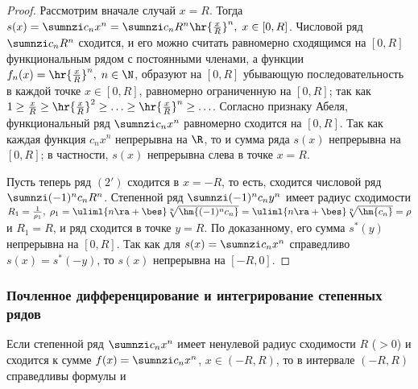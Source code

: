 \documentclass[a4paper]{article}
\begin{document}
\begin{proof}
Рассмотрим вначале случай $x=R$. Тогда $s(x) = \sumnzi c_nx^n =
\sumnzi c_nR^n \hr{\frac{x}R}^n, \; x\in[0,R]$. Числовой ряд
$\sumnzi c_nR^n$ сходится, и его можно считать равномерно сходящимся
на $[0,R]$ функциональным рядом с постоянными членами, а функции
$f_n(x) = \hr{\frac{x}R}^n, \; n\in\N$, образуют на $[0,R]$
убывающую последовательность в каждой точке $x\in[0,R]$, равномерно
ограниченную на $[0,R]$; так как $1\ge \frac{x}R \ge
\hr{\frac{x}R}^2 \ge \ldots \ge \hr{\frac{x}R}^n \ge \ldots$.
Согласно признаку Абеля, функциональный ряд $\sumnzi c_nx^n$
равномерно сходится на $[0,R]$. Так как каждая функция $c_nx^n$
непрерывна на $\R$, то и сумма ряда $s(x)$ непрерывна на $[0,R]$; в
частности, $s(x)$ непрерывна слева в точке $x=R$.

Пусть теперь ряд $(2')$ сходится в $x=-R$, то есть, сходится
числовой ряд $\sumnzi (-1)^nc_nR^n$. Степенной ряд $\sumnzi (-1)^n
c_n y^n$
имеет радиус сходимости $R_1 = \frac1{\rho_1}, \; \rho_1 =
\uliml{n\ra+\bes} \sqrt[n]{\hm{(-1)^n c_n}} = \uliml{n\ra+\bes}
\sqrt[n]{\hm{c_n}} = \rho$ и $R_1=R$, и ряд сходится в точке $y=R$.
По доказанному, его сумма $s^*(y)$ непрерывна на $[0,R]$. Так как
для $s(x) = \sumnzi c_nx^n$ справедливо $s(x) = s^*(-y)$,
то $s(x)$ непрерывна на $[-R,0]$.
\end{proof}

\subsubsection{Почленное дифференцирование и интегрирование
степенных рядов}

\begin{theorem}
Если степенной ряд $\sumnzi c_nx^n$ имеет ненулевой радиус
сходимости $R$ ($>0$) и сходится к сумме $f(x) = \sumnzi c_nx^n$,
$x\in(-R,R)$, то в интервале $(-R,R)$ справедливы формулы
 и
\end{theorem}
\end{document}
